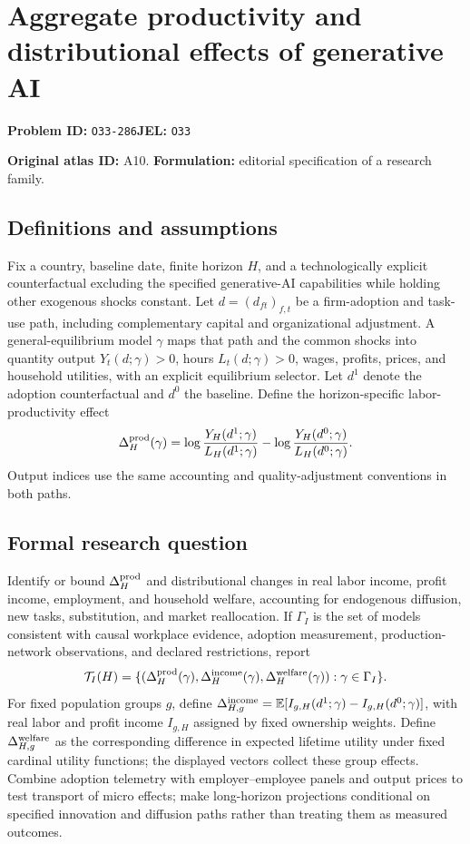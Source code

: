 \documentclass[11pt,a4paper]{article}
\begin{document}
\section*{Aggregate productivity and distributional effects of generative AI}
\textbf{Problem ID:} \texttt{O33-286}\quad \textbf{JEL:} \texttt{O33}\par
\label{problem:OP-0020}
\label{atlas:prob:A10}

\noindent\textbf{Original atlas ID:} A10. \textbf{Formulation:} editorial specification of a research family.

\subsection*{Definitions and assumptions}

Fix a country, baseline date, finite horizon $H$, and a technologically explicit counterfactual excluding the specified generative-AI capabilities while holding other exogenous shocks constant. Let $d=(d_{ft})_{f,t}$ be a firm-adoption and task-use path, including complementary capital and organizational adjustment. A general-equilibrium model $\gamma$ maps that path and the common shocks into quantity output $Y_t(d;\gamma)>0$, hours $L_t(d;\gamma)>0$, wages, profits, prices, and household utilities, with an explicit equilibrium selector. Let $d^1$ denote the adoption counterfactual and $d^0$ the baseline. Define the horizon-specific labor-productivity effect
\[
\Delta_H^{\rm prod}(\gamma)=\log\frac{Y_H(d^1;\gamma)}{L_H(d^1;\gamma)}-
 \log\frac{Y_H(d^0;\gamma)}{L_H(d^0;\gamma)}.
\]
Output indices use the same accounting and quality-adjustment conventions in both paths.

\subsection*{Formal research question}

Identify or bound $\Delta_H^{\rm prod}$ and distributional changes in real labor income, profit income, employment, and household welfare, accounting for endogenous diffusion, new tasks, substitution, and market reallocation. If $\Gamma_I$ is the set of models consistent with causal workplace evidence, adoption measurement, production-network observations, and declared restrictions, report
\[
\mathcal T_I(H)=\{(\Delta_H^{\rm prod}(\gamma),\Delta_H^{\rm income}(\gamma),
 \Delta_H^{\rm welfare}(\gamma)):\gamma\in\Gamma_I\}.
\]
For fixed population groups $g$, define $\Delta_{H,g}^{\rm income}=\mathbb E[I_{g,H}(d^1;\gamma)-I_{g,H}(d^0;\gamma)]$, with real labor and profit income $I_{g,H}$ assigned by fixed ownership weights. Define $\Delta_{H,g}^{\rm welfare}$ as the corresponding difference in expected lifetime utility under fixed cardinal utility functions; the displayed vectors collect these group effects. Combine adoption telemetry with employer--employee panels and output prices to test transport of micro effects; make long-horizon projections conditional on specified innovation and diffusion paths rather than treating them as measured outcomes.
\end{document}

